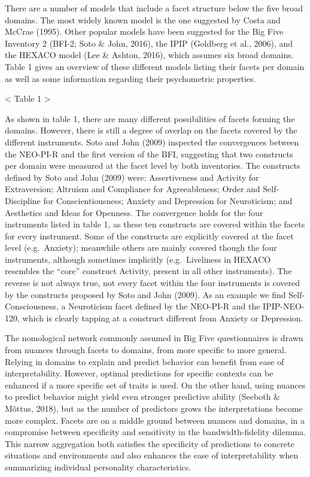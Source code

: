 \documentclass[,man,floatsintext]{apa6}
\theoremstyle{definition}
\theoremstyle{definition}
\theoremstyle{definition}
\theoremstyle{remark}
\begin{document}
There are a number of models that include a facet structure below the
five broad domains. The most widely known model is the one suggested by
Costa and McCrae (1995). Other popular models have been suggested for
the Big Five Inventory 2 (BFI-2; Soto \& John, 2016), the IPIP (Goldberg
et al., 2006), and the HEXACO model (Lee \& Ashton, 2016), which assumes
six broad domains. Table 1 gives an overview of these different models
listing their facets per domain as well as some information regarding
their psychometric properties.

\textless{} Table 1 \textgreater{}

As shown in table 1, there are many different possibilities of facets
forming the domains. However, there is still a degree of overlap on the
facets covered by the different instruments. Soto and John (2009)
inspected the convergences between the NEO-PI-R and the first version of
the BFI, suggesting that two constructs per domain were measured at the
facet level by both inventories. The constructs defined by Soto and John
(2009) were: Assertiveness and Activity for Extraversion; Altruism and
Compliance for Agreeableness; Order and Self-Discipline for
Conscientiousness; Anxiety and Depression for Neuroticism; and
Aesthetics and Ideas for Openness. The convergence holds for the four
instruments listed in table 1, as these ten constructs are covered
within the facets for every instrument. Some of the constructs are
explicitly covered at the facet level (e.g.~Anxiety); meanwhile others
are mainly covered though the four instruments, although sometimes
implicitly (e.g.~Liveliness in HEXACO resembles the \enquote{core}
construct Activity, present in all other instruments). The reverse is
not always true, not every facet within the four instruments is covered
by the constructs proposed by Soto and John (2009). As an example we
find Self-Consciousness, a Neuroticism facet defined by the NEO-PI-R and
the IPIP-NEO-120, which is clearly tapping at a construct different from
Anxiety or Depression.

The nomological network commonly assumed in Big Five questionnaires is
drawn from nuances through facets to domains, from more specific to more
general. Relying in domains to explain and predict behavior can benefit
from ease of interpretability. However, optimal predictions for specific
contexts can be enhanced if a more specific set of traits is used. On
the other hand, using nuances to predict behavior might yield even
stronger predictive ability (Seeboth \& Mõttus, 2018), but as the number
of predictors grows the interpretations become more complex. Facets are
on a middle ground between nuances and domains, in a compromise between
specificity and sensitivity in the bandwidth-fidelity dilemma. This
narrow aggregation both satisfies the specificity of predictions to
concrete situations and environments and also enhances the ease of
interpretability when summarizing individual personality
characteristics.
\end{document}
